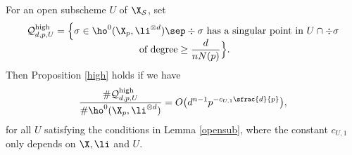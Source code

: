 \begin{lem}\label{opensubworks}
For an open subscheme $U$ of $\X_\mathcal{S}$, set
\begin{multline*}
\mathcal{Q}^{\mathrm{high}}_{d,p,U}=\Bigl\{ \sigma\in \ho^0(\X_{p}, \li^{\otimes d})\sep \div \sigma \text{ has a singular point in } U\cap \div \sigma\\[-5pt] \text{ of degree}\geq \frac{d}{nN(p)}\Bigr\}.
\end{multline*}
Then Proposition \ref{high} holds if we have
\[
\frac{\#\mathcal{Q}_{d,p,U}^{\mathrm{high}}}{\#\ho^0(\X_{p}, \li^{\otimes d})}=O\bigl(d^{n-1}p^{-c_{U,1}\sfrac{d}{p}} \bigr),
\]
for all $U$ satisfying the conditions in Lemma \ref{opensub}, where the constant $c_{U,1}$ only depends on $\X,\li$ and $U$.
\end{lem}


